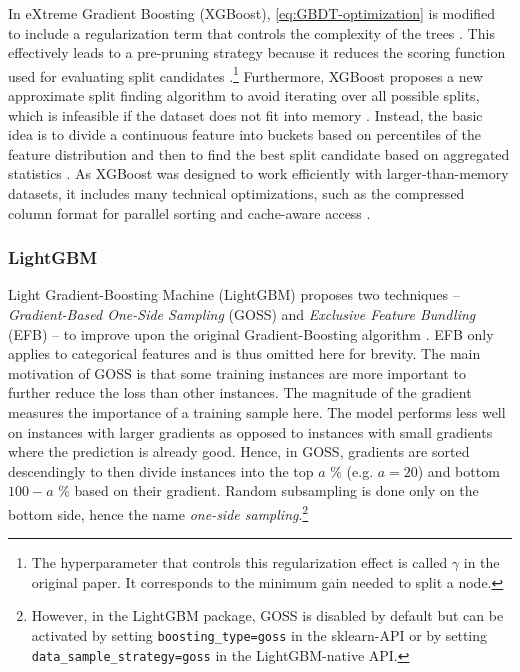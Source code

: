 In eXtreme Gradient Boosting (XGBoost), \cref{eq:GBDT-optimization} is modified to include a regularization term that controls the complexity of the trees \parencite[2]{chen_xgboost_2016}. This effectively leads to a pre-pruning strategy because it reduces the scoring function used for evaluating split candidates \parencites[1941--1942]{bentejac_comparative_2021}.\footnote{The hyperparameter that controls this regularization effect is called $\gamma$ in the original paper. It corresponds to the minimum gain needed to split a node.}
Furthermore, XGBoost proposes a new approximate split finding algorithm to avoid iterating over all possible splits, which is infeasible if the dataset does not fit into memory \parencite[Chapter~3]{chen_xgboost_2016}. Instead, the basic idea is to divide a continuous feature into buckets based on percentiles of the feature distribution and then to find the best split candidate based on aggregated statistics \parencite[Chapter~3.2]{chen_xgboost_2016}.
As XGBoost was designed to work efficiently with larger-than-memory datasets, it includes many technical optimizations, such as the compressed column format for parallel sorting and cache-aware access \parencite[Chapter~4]{chen_xgboost_2016}.

\subsubsection{LightGBM}

Light Gradient-Boosting Machine (LightGBM) proposes two techniques -- \textit{Gradient-Based One-Side Sampling} (GOSS) and \textit{Exclusive Feature Bundling} (EFB) -- to improve upon the original Gradient-Boosting algorithm \parencite[1]{ke_lightgbm_2017}. EFB only applies to categorical features and is thus omitted here for brevity. The main motivation of GOSS is that some training instances are more important to further reduce the loss than other instances. The magnitude of the gradient measures the importance of a training sample here. The model performs less well on instances with larger gradients as opposed to instances with small gradients where the prediction is already good. Hence, in GOSS, gradients are sorted descendingly to then divide instances into the top $a$ \% (e.g. $a=20$) and bottom $100 - a$ \% based on their gradient. Random subsampling is done only on the bottom side, hence the name \textit{one-side sampling}.\footnote{However, in the LightGBM package, GOSS is disabled by default but can be activated by setting \texttt{boosting\_type=goss} in the sklearn-API or by setting \texttt{data\_sample\_strategy=goss} in the LightGBM-native API.}

